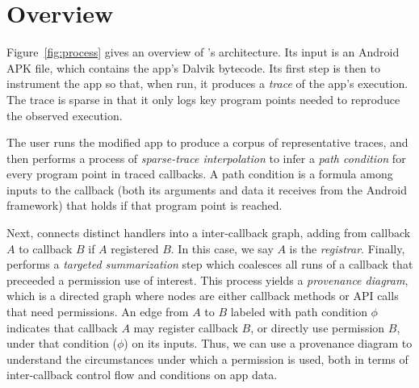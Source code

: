 








\section{Overview}
\label{sec:overview}

Figure~\ref{fig:process} gives an overview of \hogarth{}'s
architecture.  Its input is an Android APK file, which
contains the app's Dalvik bytecode. Its first step is then
to instrument the app so that, when run, it produces a \emph{trace} of
the app's execution. The trace is sparse in that it only
logs key program points needed to reproduce the observed execution.

The user runs the modified app to produce a corpus of
representative traces, and then \hogarth{} performs a process of
\emph{sparse-trace interpolation} to infer a \emph{path condition}
for every program point in traced callbacks. A path condition is a
formula among inputs to the callback (both its arguments and data
it receives from the Android framework) that holds if that
program point is reached.

Next, \hogarth{} connects distinct handlers into a inter-callback graph,
adding from callback $A$ to callback $B$ if $A$ registered $B$. In
this case, we say $A$ is the \emph{registrar}. Finally, \hogarth{}
performs a \textit{targeted summarization} step which
coalesces all runs of a callback that preceeded a permission use of interest.
%
This process yields a \textit{provenance diagram}, which is a directed graph
where nodes are either callback methods or API calls that need permissions.
An edge from $A$ to $B$ labeled with path condition $\phi$ indicates that callback
$A$ may register callback $B$, or directly use permission $B$, under that
condition ($\phi$) on its inputs. Thus, we can use a provenance diagram to understand the
circumstances under which a permission is used, both in terms of
inter-callback control flow and conditions on app data.


